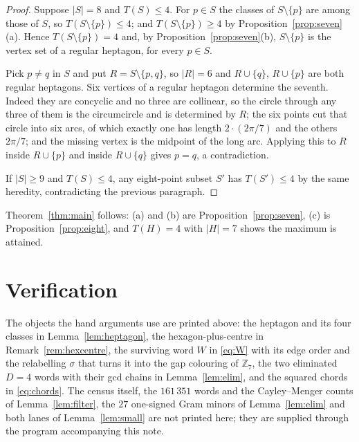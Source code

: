 \documentclass[11pt]{amsart}
\numberwithin{theorem}{section}
\theoremstyle{remark}
\theoremstyle{definition}
\newcommand{\Tcount}{T}
\newcommand{\Zs}{\mathbb Z}
\begin{document}
\begin{proof}
Suppose $|S|=8$ and $\Tcount(S)\le4$. For $p\in S$ the classes of $S\setminus\{p\}$
are among those of $S$, so $\Tcount(S\setminus\{p\})\le4$; and
$\Tcount(S\setminus\{p\})\ge4$ by Proposition~\ref{prop:seven}(a). Hence
$\Tcount(S\setminus\{p\})=4$ and, by Proposition~\ref{prop:seven}(b),
$S\setminus\{p\}$ is the vertex set of a regular heptagon, for every
$p\in S$.

Pick $p\ne q$ in $S$ and put $R=S\setminus\{p,q\}$, so $|R|=6$ and
$R\cup\{q\}$, $R\cup\{p\}$ are both regular heptagons. Six vertices of a
regular heptagon determine the seventh. Indeed they are concyclic and no three
are collinear, so the circle through any three of them is the circumcircle and
is determined by $R$; the six points cut that circle into six arcs, of which
exactly one has length $2\cdot(2\pi/7)$ and the others $2\pi/7$; and the
missing vertex is the midpoint of the long arc. Applying this to $R$ inside
$R\cup\{p\}$ and inside $R\cup\{q\}$ gives $p=q$, a contradiction.

If $|S|\ge9$ and $\Tcount(S)\le4$, any eight-point subset $S'$ has
$\Tcount(S')\le4$ by the same heredity, contradicting the previous paragraph.
\end{proof}

Theorem~\ref{thm:main} follows: (a) and (b) are Proposition~\ref{prop:seven},
(c) is Proposition~\ref{prop:eight}, and $\Tcount(H)=4$ with $|H|=7$ shows the
maximum is attained.

\section{Verification}\label{sec:verify}

The objects the hand arguments use are printed above: the heptagon and its four
classes in Lemma~\ref{lem:heptagon}, the hexagon-plus-centre in
Remark~\ref{rem:hexcentre}, the surviving word $W$ in \eqref{eq:W} with its edge
order and the relabelling $\sigma$ that turns it into the gap colouring of
$\Zs_7$, the two eliminated $D=4$ words with their gcd chains in
Lemma~\ref{lem:elim}, and the squared chords in \eqref{eq:chords}. The census
itself, the $161\,351$ words and the Cayley--Menger counts of
Lemma~\ref{lem:filter}, the $27$ one-signed Gram minors of
Lemma~\ref{lem:elim} and both lanes of Lemma~\ref{lem:small} are not printed
here; they are supplied through the program accompanying this note.
\end{document}
